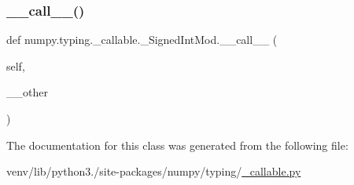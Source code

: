 \mbox{\label{classnumpy_1_1typing_1_1__callable_1_1__SignedIntMod_aed79bb9d26e69a856e7def476c963a89}} 
\subsubsection{\texorpdfstring{\+\_\+\+\_\+call\+\_\+\+\_\+()}{\_\_call\_\_()}\hspace{0.1cm}{\footnotesize\ttfamily [4/4]}}
{\footnotesize\ttfamily def numpy.\+typing.\+\_\+callable.\+\_\+\+Signed\+Int\+Mod.\+\_\+\+\_\+call\+\_\+\+\_\+ (\begin{DoxyParamCaption}\item[{}]{self,  }\item[{}]{\+\_\+\+\_\+other }\end{DoxyParamCaption})}



The documentation for this class was generated from the following file\+:\begin{DoxyCompactItemize}
\item 
venv/lib/python3./site-\/packages/numpy/typing/\hyperlink{__callable_8py}{\+\_\+callable.\+py}\end{DoxyCompactItemize}
